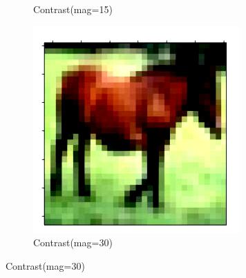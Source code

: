 \documentclass[onecolumn]{ujarticle}   %
\begin{document}
\begin{figure}[h]
\begin{subfigure}{0.3\columnwidth}
        \caption{Contrast(mag=15)}
        \label{fig:Contrast_15}
      \end{subfigure}
      \begin{subfigure}{0.3\columnwidth}
        \centering
        \includegraphics[width=1.0\columnwidth]{transform_test/Contrast_30.png}
        \caption{Contrast(mag=30)}
        \label{fig:Contrast_30}
      \end{subfigure}


\end{figure}
\end{document}
